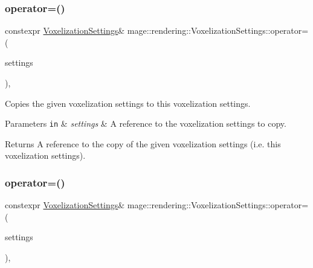 \hypertarget{classmage_1_1rendering_1_1_voxelization_settings_ae21513856299e74c147c5d347b36961a}{}\label{classmage_1_1rendering_1_1_voxelization_settings_ae21513856299e74c147c5d347b36961a} 
\subsubsection{\texorpdfstring{operator=()}{operator=()}\hspace{0.1cm}{\footnotesize\ttfamily [1/2]}}
{\footnotesize\ttfamily constexpr \hyperlink{classmage_1_1rendering_1_1_voxelization_settings}{Voxelization\+Settings}\& mage\+::rendering\+::\+Voxelization\+Settings\+::operator= (\begin{DoxyParamCaption}\item[{const \hyperlink{classmage_1_1rendering_1_1_voxelization_settings}{Voxelization\+Settings} \&}]{settings }\end{DoxyParamCaption})\hspace{0.3cm}{\ttfamily [default]}, {\ttfamily [noexcept]}}

Copies the given voxelization settings to this voxelization settings.


\begin{DoxyParams}[1]{Parameters}
\mbox{\tt in}  & {\em settings} & A reference to the voxelization settings to copy. \\
\hline
\end{DoxyParams}
\begin{DoxyReturn}{Returns}
A reference to the copy of the given voxelization settings (i.\+e. this voxelization settings). 
\end{DoxyReturn}
\hypertarget{classmage_1_1rendering_1_1_voxelization_settings_a96ea5fa3e2a8bdab0b4835caa11bd13f}{}\label{classmage_1_1rendering_1_1_voxelization_settings_a96ea5fa3e2a8bdab0b4835caa11bd13f} 
\subsubsection{\texorpdfstring{operator=()}{operator=()}\hspace{0.1cm}{\footnotesize\ttfamily [2/2]}}
{\footnotesize\ttfamily constexpr \hyperlink{classmage_1_1rendering_1_1_voxelization_settings}{Voxelization\+Settings}\& mage\+::rendering\+::\+Voxelization\+Settings\+::operator= (\begin{DoxyParamCaption}\item[{\hyperlink{classmage_1_1rendering_1_1_voxelization_settings}{Voxelization\+Settings} \&\&}]{settings }\end{DoxyParamCaption})\hspace{0.3cm}{\ttfamily [default]}, {\ttfamily [noexcept]}}

